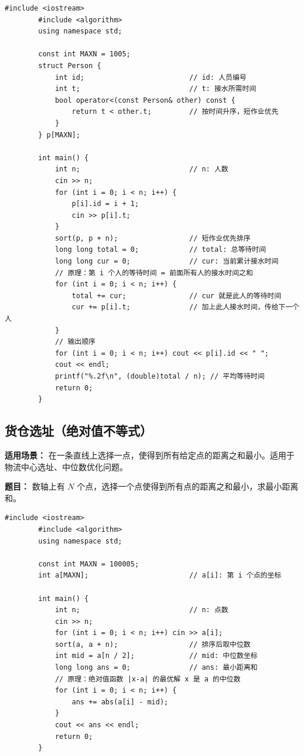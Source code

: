 \documentclass[12pt,a4paper]{ctexart}
\begin{document}
	\begin{lstlisting}[caption={贪心——按服务时间升序排队，短作业优先}]
		#include <iostream>
		#include <algorithm>
		using namespace std;
		
		const int MAXN = 1005;
		struct Person {
			int id;                         // id: 人员编号
			int t;                          // t: 接水所需时间
			bool operator<(const Person& other) const {
				return t < other.t;         // 按时间升序，短作业优先
			}
		} p[MAXN];
		
		int main() {
			int n;                          // n: 人数
			cin >> n;
			for (int i = 0; i < n; i++) {
				p[i].id = i + 1;
				cin >> p[i].t;
			}
			sort(p, p + n);                 // 短作业优先排序
			long long total = 0;            // total: 总等待时间
			long long cur = 0;              // cur: 当前累计接水时间
			// 原理：第 i 个人的等待时间 = 前面所有人的接水时间之和
			for (int i = 0; i < n; i++) {
				total += cur;               // cur 就是此人的等待时间
				cur += p[i].t;              // 加上此人接水时间，传给下一个人
			}
			// 输出顺序
			for (int i = 0; i < n; i++) cout << p[i].id << " ";
			cout << endl;
			printf("%.2f\n", (double)total / n); // 平均等待时间
			return 0;
		}
	\end{lstlisting}
	
	\subsection{货仓选址（绝对值不等式）}
	\textbf{适用场景：} 在一条直线上选择一点，使得到所有给定点的距离之和最小。适用于物流中心选址、中位数优化问题。
	
	\textbf{题目：} 数轴上有 \(N\) 个点，选择一个点使得到所有点的距离之和最小，求最小距离和。
	
	\begin{lstlisting}[caption={贪心——选中位数，利用绝对值不等式}]
		#include <iostream>
		#include <algorithm>
		using namespace std;
		
		const int MAXN = 100005;
		int a[MAXN];                        // a[i]: 第 i 个点的坐标
		
		int main() {
			int n;                          // n: 点数
			cin >> n;
			for (int i = 0; i < n; i++) cin >> a[i];
			sort(a, a + n);                 // 排序后取中位数
			int mid = a[n / 2];             // mid: 中位数坐标
			long long ans = 0;              // ans: 最小距离和
			// 原理：绝对值函数 |x-a| 的最优解 x 是 a 的中位数
			for (int i = 0; i < n; i++) {
				ans += abs(a[i] - mid);
			}
			cout << ans << endl;
			return 0;
		}
	\end{lstlisting}
	
\end{document}

